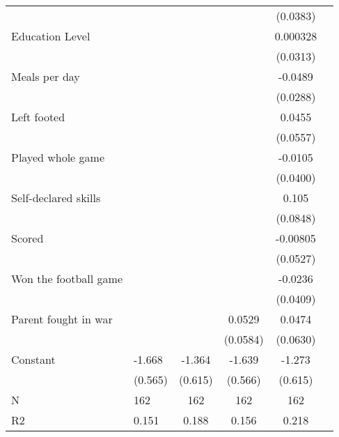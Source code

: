 {\begin{tabularx}{0.8\textwidth}{Xl*{4}{c}}
                    &                     &                     &                     &    (0.0383)         \\
[0.5em]
Education Level     &                     &                     &                     &    0.000328         \\
                    &                     &                     &                     &    (0.0313)         \\
[0.5em]
Meals per day       &                     &                     &                     &     -0.0489\sym{*}  \\
                    &                     &                     &                     &    (0.0288)         \\
[0.5em]
Left footed         &                     &                     &                     &      0.0455         \\
                    &                     &                     &                     &    (0.0557)         \\
[0.5em]
Played whole game   &                     &                     &                     &     -0.0105         \\
                    &                     &                     &                     &    (0.0400)         \\
[0.5em]
Self-declared skills&                     &                     &                     &       0.105         \\
                    &                     &                     &                     &    (0.0848)         \\
[0.5em]
Scored              &                     &                     &                     &    -0.00805         \\
                    &                     &                     &                     &    (0.0527)         \\
[0.5em]
Won the football game&                     &                     &                     &     -0.0236         \\
                    &                     &                     &                     &    (0.0409)         \\
[0.5em]
Parent fought in war&                     &                     &      0.0529         &      0.0474         \\
                    &                     &                     &    (0.0584)         &    (0.0630)         \\
[0.5em]
Constant            &      -1.668\sym{***}&      -1.364\sym{**} &      -1.639\sym{***}&      -1.273\sym{**} \\
                    &     (0.565)         &     (0.615)         &     (0.566)         &     (0.615)         \\

\hline
N                   &         162         &         162         &         162         &         162         \\
R2                  &       0.151         &       0.188         &       0.156         &       0.218         \\
\hline\hline
\end{tabularx}
}
